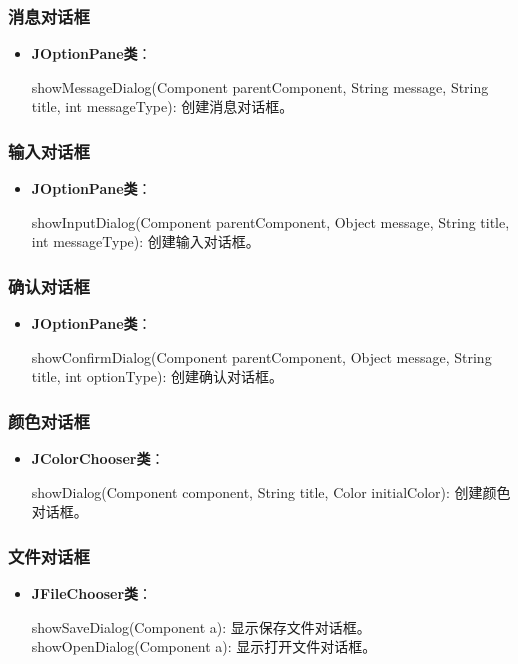 \documentclass[a4paper, 10pt]{ctexart}
\begin{document}
\subsubsection{消息对话框}
\begin{itemize}
  \item \textbf{JOptionPane类}：
  \begin{codeblock}
showMessageDialog(Component parentComponent, String message, String title, int messageType): 创建消息对话框。
  \end{codeblock}
\end{itemize}

\subsubsection{输入对话框}
\begin{itemize}
  \item \textbf{JOptionPane类}：
  \begin{codeblock}
showInputDialog(Component parentComponent, Object message, String title, int messageType): 创建输入对话框。
  \end{codeblock}
\end{itemize}

\subsubsection{确认对话框}
\begin{itemize}
  \item \textbf{JOptionPane类}：
  \begin{codeblock}
showConfirmDialog(Component parentComponent, Object message, String title, int optionType): 创建确认对话框。
  \end{codeblock}
\end{itemize}

\subsubsection{颜色对话框}
\begin{itemize}
  \item \textbf{JColorChooser类}：
  \begin{codeblock}
showDialog(Component component, String title, Color initialColor): 创建颜色对话框。
  \end{codeblock}
\end{itemize}

\subsubsection{文件对话框}
\begin{itemize}
  \item \textbf{JFileChooser类}：
  \begin{codeblock}
showSaveDialog(Component a): 显示保存文件对话框。
showOpenDialog(Component a): 显示打开文件对话框。
  \end{codeblock}
\end{itemize}
\end{document}

